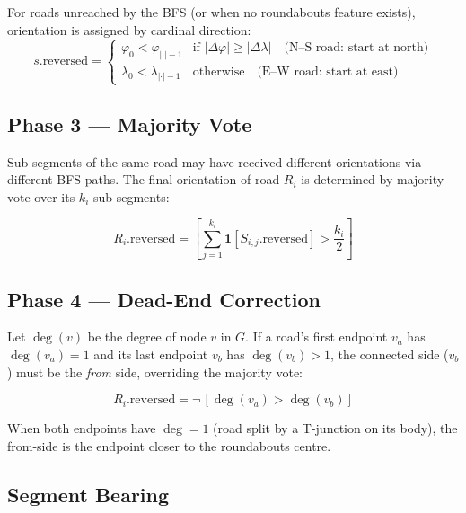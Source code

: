 \documentclass[12pt,a4paper]{article}
\theoremstyle{definition}
\theoremstyle{plain}
\theoremstyle{remark}
\begin{document}
For roads unreached by the BFS (or when no roundabouts feature exists), orientation
is assigned by cardinal direction:
\begin{equation}
  s.\mathrm{reversed} =
  \begin{cases}
    \varphi_0 < \varphi_{|\cdot|-1} & \text{if } |\Delta\varphi| \geq |\Delta\lambda| \quad
      \text{(N--S road: start at north)} \\
    \lambda_0 < \lambda_{|\cdot|-1} & \text{otherwise} \quad
      \text{(E--W road: start at east)}
  \end{cases}
  \label{eq:geographic_fallback}
\end{equation}

\subsection{Phase 3 — Majority Vote}

Sub-segments of the same road may have received different orientations via
different BFS paths. The final orientation of road $R_i$ is determined by
majority vote over its $k_i$ sub-segments:

\begin{equation}
  R_i.\mathrm{reversed} =
  \left[
    \sum_{j=1}^{k_i} \mathbf{1}[S_{i,j}.\mathrm{reversed}]
    > \frac{k_i}{2}
  \right]
  \label{eq:majority_vote}
\end{equation}

\subsection{Phase 4 — Dead-End Correction}

Let $\deg(v)$ be the degree of node $v$ in $G$. If a road's first endpoint
$v_a$ has $\deg(v_a) = 1$ and its last endpoint $v_b$ has $\deg(v_b) > 1$,
the connected side ($v_b$) must be the \emph{from} side, overriding the
majority vote:

\begin{equation}
  R_i.\mathrm{reversed} = \neg\,[\deg(v_a) > \deg(v_b)]
  \label{eq:dead_end}
\end{equation}

When both endpoints have $\deg = 1$ (road split by a T-junction on its
body), the from-side is the endpoint closer to the roundabouts centre.

\subsection{Segment Bearing}
\end{document}

